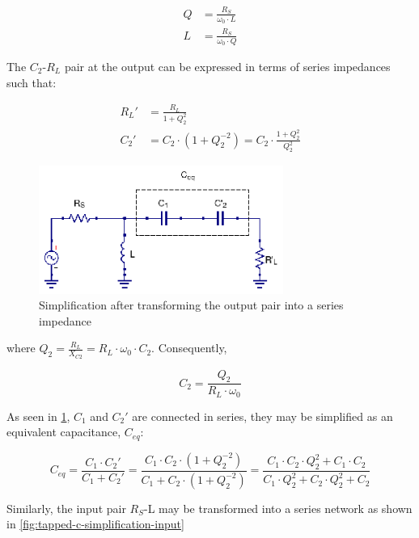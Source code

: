 \begin{align}
  Q &= \frac{R_S}{\omega_0 \cdot L}\\
  L &= \frac{R_S}{\omega_0 \cdot Q}
\end{align}

\noindent The $C_2$-$R_L$ pair at the output can be expressed in terms of series impedances such that:

\begin{align}
  R_L' &= \frac{R_L}{1 + Q_2^2}\\
  C_2' &= C_2 \cdot (1 + Q_2^{-2}) = C_2 \cdot \frac{1 + Q_2^2}{Q_2^2}
\end{align}


\begin{figure}[H]
\centering
\includegraphics[width=80mm]{./images/Synthesis/Impedance_Matching/Tapped-C-ckt-equivalent}
\caption{Simplification after transforming the output pair into a series impedance}
\label{fig:tapped-c-simplification}
\end{figure}


\noindent where $Q_2 = \frac{R_L}{X_{C2}} = R_L \cdot \omega_0 \cdot C_2$. Consequently,

\begin{equation}
C_2 = \frac{Q_2}{R_L \cdot \omega_0}
\end{equation}

\noindent As seen in \ref{fig:tapped-c-simplification}, $C_1$ and $C_2'$ are connected in series, they may be simplified as an equivalent capacitance, $C_{eq}$:

\begin{equation}
C_{eq} = \frac{C_1 \cdot C_2'}{C_1 + C_2'} = \frac{C_1 \cdot C_2 \cdot (1 + Q_2^{-2})}{C_1 + C_2 \cdot(1 + Q_2^{-2})} = \frac{C_1 \cdot C_2 \cdot Q_2^2 + C_1 \cdot C_2}{C_1 \cdot Q_2^2 + C_2 \cdot Q_2^2 + C_2}
\end{equation}

\noindent Similarly, the input pair $R_S$-L may be transformed into a series network as shown in \ref{fig:tapped-c-simplification-input}

